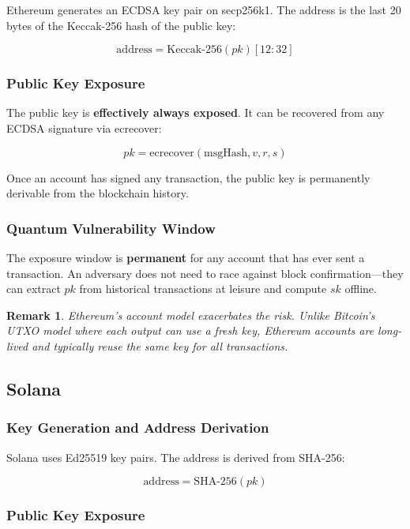 \documentclass[11pt,a4paper]{article}
\newtheorem{remark}{Remark}[section]
\begin{document}
Ethereum generates an ECDSA key pair on secp256k1. The address is
the last 20 bytes of the Keccak-256 hash of the public key:

\[
\text{address} = \text{Keccak-256}(pk)[12{:}32]
\]

\subsubsection{Public Key Exposure}

The public key is \textbf{effectively always exposed}. It can be
recovered from any ECDSA signature via ecrecover:

\[
pk = \text{ecrecover}(\text{msgHash}, v, r, s)
\]

Once an account has signed any transaction, the public key is
permanently derivable from the blockchain history.

\subsubsection{Quantum Vulnerability Window}

The exposure window is \textbf{permanent} for any account that has
ever sent a transaction. An adversary does not need to race against
block confirmation---they can extract $pk$ from historical transactions
at leisure and compute $sk$ offline.

\begin{remark}
Ethereum's account model exacerbates the risk. Unlike Bitcoin's UTXO
model where each output can use a fresh key, Ethereum accounts are
long-lived and typically reuse the same key for all transactions.
\end{remark}

\subsection{Solana}

\subsubsection{Key Generation and Address Derivation}

Solana uses Ed25519 key pairs. The address is derived from SHA-256:

\[
\text{address} = \text{SHA-256}(pk)
\]

\subsubsection{Public Key Exposure}
\end{document}
